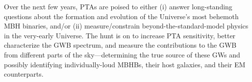\documentclass[onecolumn,authoryear]{els-mrw}
\begin{document}
Over the next few years, PTAs are poised to either (i) answer long-standing questions about the formation and evolution of the Universe's most behemoth MBH binaries, and/or (ii) measure/constrain beyond-the-standard-model physics in the very-early Universe.  The hunt is on to increase PTA sensitivity, better characterize the GWB spectrum, and measure the contributions to the GWB from different parts of the sky---determining the true source of these GWs and possibly identifying individually-loud MBHBs, their host galaxies, and their EM counterparts.










% 


\end{document}
